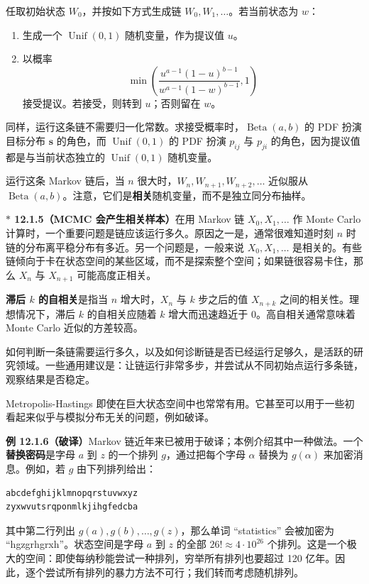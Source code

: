 \documentclass[UTF8,12pt,a4paper,fontset=fandol]{ctexart}
\newcommand{\biohazard}{\ensuremath{\ast}}
\begin{document}
任取初始状态 $W_0$，并按如下方式生成链 $W_0,W_1,\ldots$。若当前状态为 $w$：
\begin{enumerate}
  \item 生成一个 $\operatorname{Unif}(0,1)$ 随机变量，作为提议值 $u$。
  \item 以概率
  \[
    \min\left(
      \frac{u^{a-1}(1-u)^{b-1}}{w^{a-1}(1-w)^{b-1}},
      1
    \right)
  \]
  接受提议。若接受，则转到 $u$；否则留在 $w$。
\end{enumerate}

同样，运行这条链不需要归一化常数。求接受概率时，$\operatorname{Beta}(a,b)$ 的 PDF 扮演目标分布 $\mathbf s$ 的角色，而 $\operatorname{Unif}(0,1)$ 的 PDF 扮演 $p_{ij}$ 与 $p_{ji}$ 的角色，因为提议值都是与当前状态独立的 $\operatorname{Unif}(0,1)$ 随机变量。

运行这条 Markov 链后，当 $n$ 很大时，$W_n,W_{n+1},W_{n+2},\ldots$ 近似服从 $\operatorname{Beta}(a,b)$。注意，它们是\textbf{相关}随机变量，而不是独立同分布抽样。

\noindent\textbf{$\biohazard$ 12.1.5（MCMC 会产生相关样本）}\quad 在用 Markov 链 $X_0,X_1,\ldots$ 作 Monte Carlo 计算时，一个重要问题是链应该运行多久。原因之一是，通常很难知道时刻 $n$ 时链的分布离平稳分布有多近。另一个问题是，一般来说 $X_0,X_1,\ldots$ 是相关的。有些链倾向于卡在状态空间的某些区域，而不是探索整个空间；如果链很容易卡住，那么 $X_n$ 与 $X_{n+1}$ 可能高度正相关。

\textbf{滞后 $k$ 的自相关}是指当 $n$ 增大时，$X_n$ 与 $k$ 步之后的值 $X_{n+k}$ 之间的相关性。理想情况下，滞后 $k$ 的自相关应随着 $k$ 增大而迅速趋近于 $0$。高自相关通常意味着 Monte Carlo 近似的方差较高。

如何判断一条链需要运行多久，以及如何诊断链是否已经运行足够久，是活跃的研究领域。一些通用建议是：让链运行非常多步，并尝试从不同初始点运行多条链，观察结果是否稳定。

Metropolis-Hastings 即使在巨大状态空间中也常常有用。它甚至可以用于一些初看起来似乎与模拟分布无关的问题，例如破译。

\noindent\textbf{例 12.1.6（破译）}\quad Markov 链近年来已被用于破译；本例介绍其中一种做法。一个\textbf{替换密码}是字母 $a$ 到 $z$ 的一个排列 $g$，通过把每个字母 $\alpha$ 替换为 $g(\alpha)$ 来加密消息。例如，若 $g$ 由下列排列给出：
\begin{verbatim}
abcdefghijklmnopqrstuvwxyz
zyxwvutsrqponmlkjihgfedcba
\end{verbatim}
其中第二行列出 $g(a),g(b),\ldots,g(z)$，那么单词 ``statistics'' 会被加密为 ``hgzgrhgrxh''。状态空间是字母 $a$ 到 $z$ 的全部 $26!\approx4\cdot10^{26}$ 个排列。这是一个极大的空间：即使每纳秒能尝试一种排列，穷举所有排列也要超过 120 亿年。因此，逐个尝试所有排列的暴力方法不可行；我们转而考虑随机排列。
\end{document}
